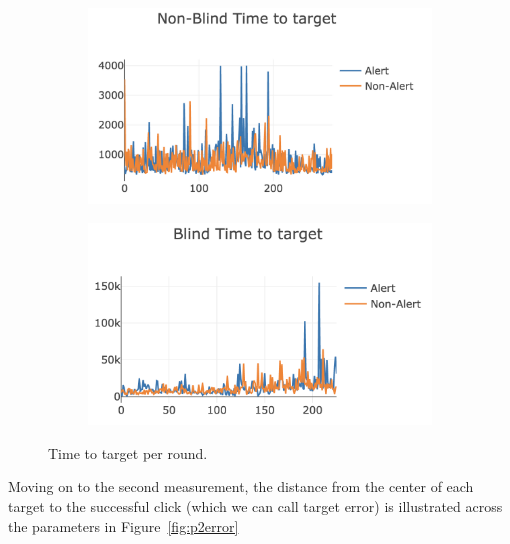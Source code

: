 \documentclass[
12pt, %
oneside, %
english, %
doublespacing, %
headsepline, %
]{MastersDoctoralThesis} %
\begin{document}
\begin{figure}[th]
	\centering
  \begin{subfigure}[b]{0.4\textwidth}
		\centering
    \includegraphics[width=1.2\textwidth]{images/nonblindtiming}
		\decoRule
  \end{subfigure}
  \begin{subfigure}[b]{0.4\textwidth}
		\centering
    \includegraphics[width=1.2\textwidth]{images/blindtiming}
		\decoRule
  \end{subfigure}
	\caption[Phase 2 Timing Graph]{Time to target per round.}
	\label{fig:timing}
\end{figure}

Moving on to the second measurement, the distance from the center of each target to the successful click (which we can call target error) is illustrated across the parameters in Figure~\ref{fig:p2error}
\end{document}
